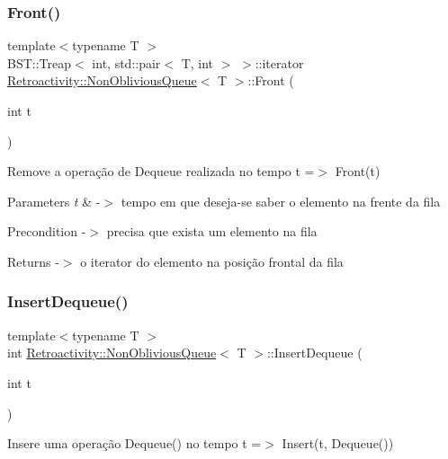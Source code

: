 \subsubsection{\texorpdfstring{Front()}{Front()}}
{\footnotesize\ttfamily template$<$typename T $>$ \\
B\+S\+T\+::\+Treap$<$ int, std\+::pair$<$ T, int $>$ $>$\+::iterator \hyperlink{classRetroactivity_1_1NonObliviousQueue}{Retroactivity\+::\+Non\+Oblivious\+Queue}$<$ T $>$\+::Front (\begin{DoxyParamCaption}\item[{int}]{t }\end{DoxyParamCaption})}

Remove a operação de Dequeue realizada no tempo t =$>$ Front(t)


\begin{DoxyParams}{Parameters}
{\em t} & -\/$>$ tempo em que deseja-\/se saber o elemento na frente da fila \\
\hline
\end{DoxyParams}
\begin{DoxyPrecond}{Precondition}
-\/$>$ precisa que exista um elemento na fila 
\end{DoxyPrecond}
\begin{DoxyReturn}{Returns}
-\/$>$ o iterator do elemento na posição frontal da fila 
\end{DoxyReturn}
\mbox{\label{classRetroactivity_1_1NonObliviousQueue_addbc4d69607c4780858457a24870b3f1}} 
\subsubsection{\texorpdfstring{Insert\+Dequeue()}{InsertDequeue()}}
{\footnotesize\ttfamily template$<$typename T $>$ \\
int \hyperlink{classRetroactivity_1_1NonObliviousQueue}{Retroactivity\+::\+Non\+Oblivious\+Queue}$<$ T $>$\+::Insert\+Dequeue (\begin{DoxyParamCaption}\item[{int}]{t }\end{DoxyParamCaption})}

Insere uma operação Dequeue() no tempo t =$>$ Insert(t, Dequeue())


